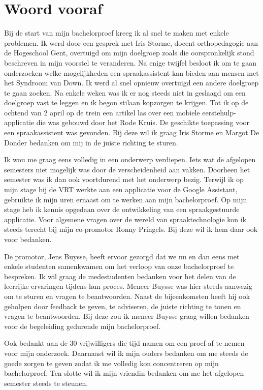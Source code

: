 
\chapter*{Woord vooraf}
\label{ch:voorwoord}

Bij de start van mijn bachelorproef kreeg ik al snel te maken met enkele problemen. Ik werd door een gesprek met Iris Storme, docent orthopedagogie aan de Hogeschool Gent, overtuigd om mijn doelgroep zoals die oorspronkelijk stond beschreven in mijn voorstel te veranderen. Na enige twijfel besloot ik om te gaan onderzoeken welke mogelijkheden een spraakassistent kan bieden aan mensen met het Syndroom van Down. Ik werd al snel opnieuw overtuigd een andere doelgroep te gaan zoeken. Na enkele weken was ik er nog steeds niet in geslaagd om een doelgroep vast te leggen en ik begon stilaan kopzorgen te krijgen. Tot ik op de ochtend van 2 april op de trein een artikel las over een mobiele eerstehulp-applicatie die was gebouwd door het Rode Kruis. De geschikte toepassing voor een spraakassistent was gevonden. Bij deze wil ik graag Iris Storme en Margot De Donder bedanken om mij in de juiste richting te sturen.

Ik wou me graag eens volledig in een onderwerp verdiepen. Iets wat de afgelopen semesters niet mogelijk was door de verscheidenheid aan vakken. Doorheen het semester was ik dan ook voortdurend met het onderwerp bezig. Terwijl ik op mijn stage bij de VRT werkte aan een applicatie voor de Google Assistant, gebruikte ik mijn uren ernaast om te werken aan mijn bachelorproef. Op mijn stage heb ik kennis opgedaan over de ontwikkeling van een spraakgestuurde applicatie. Voor algemene vragen over de wereld van spraaktechnologie kon ik steeds terecht bij mijn co-promotor Ronny Pringels. Bij deze wil ik hem daar ook voor bedanken.

De promotor, Jens Buysse, heeft ervoor gezorgd dat we nu en dan eens met enkele studenten samenkwamen om het verloop van onze bachelorproef te bespreken. Ik wil graag de medestudenten bedanken voor het delen van de leerrijke ervaringen tijdens hun proces. Meneer Buysse was hier steeds aanwezig om te sturen en vragen te beantwoorden. Naast de bijeenkomsten heeft hij ook geholpen door feedback te geven, te adviseren, de juiste richting te tonen en vragen te beantwoorden. Bij deze zou ik meneer Buysse graag willen bedanken voor de begeleiding gedurende mijn bachelorproef.

Ook bedankt aan de 30 vrijwilligers die tijd namen om een proef af te nemen voor mijn onderzoek. Daarnaast wil ik mijn ouders bedanken om me steeds de goede zorgen te geven zodat ik me volledig kon concentreren op mijn bachelorproef. Ten slotte wil ik mijn vriendin bedanken om me het afgelopen semester steeds te steunen.
